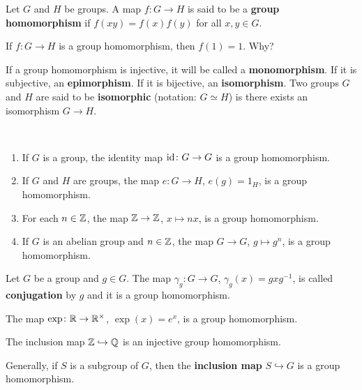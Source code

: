 
\begin{definition}
        Let $G$ and $H$ be groups. 
        A map $f\colon G\to H$ is said to be a 
        \textbf{group homomorphism} if 
        $f(xy)=f(x)f(y)$ for all $x,y\in G$.
\end{definition}

If $f\colon G\to H$ is a group homomorphism, 
then $f(1)=1$. Why? 

If a group homomorphism is injective, it will be called
a \textbf{monomorphism}. If it is subjective, 
an \textbf{epimorphism}. If it is bijective, 
an \textbf{isomorphism}. Two groups $G$ and $H$ 
are said to be \textbf{isomorphic} (notation: $G\simeq H$)
is there exists an isomorphism $G\to H$.

\begin{example}\
\begin{enumerate}
\item If $G$ is a group, the identity map $\operatorname{id}\colon G\to G$ is a group
homomorphism. 
\item If $G$ and $H$ are groups, the map $e\colon G\to H$, $e(g)=1_H$,  is a group homomorphism. 
\item For each $n\in\mathbb{Z}$, the map $\mathbb{Z}\to\mathbb{Z}$, $x\mapsto nx$, is a group homomorphism. 
\item If $G$ is an abelian group and $n\in\mathbb{Z}$, the map $G\to G$, $g\mapsto g^n$, is a group
homomorphism. 
\end{enumerate}
\end{example}

\begin{example}
Let $G$ be a group and $g\in G$. The map $\gamma_g\colon G\to G$, $\gamma_g(x)=gxg^{-1}$, is called 
\textbf{conjugation} by $g$ and it is a group homomorphism. 
\end{example}

\begin{example}
The map $\exp\colon\mathbb{R}\to\mathbb{R}^\times$, $\exp(x)=e^x$, is a group homomorphism. 
\end{example}

\begin{example}
The inclusion map $\mathbb{Z}\hookrightarrow\mathbb{Q}$ is an injective group homomorphism. 
\end{example}

Generally, if $S$ is a subgroup of $G$, 
then the \textbf{inclusion map}  $S\hookrightarrow G$ is a group
homomorphism. 

